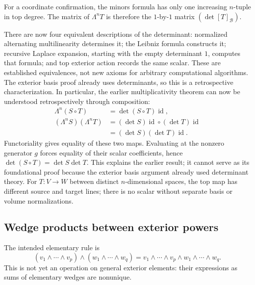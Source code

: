 For a coordinate confirmation, the minors formula has only one increasing
$n$-tuple in top degree. The matrix of $\Lambda^nT$ is therefore the
$1$-by-$1$ matrix $(\det[T]_{\mathcal B})$.

There are now four equivalent descriptions of the determinant:
normalized alternating multilinearity determines it; the Leibniz formula
constructs it; recursive Laplace expansion, starting with the empty
determinant $1$, computes that formula; and top exterior action records
the same scalar. These are established equivalences, not new axioms for
arbitrary computational algorithms. The exterior basis proof already uses
determinants, so this is a retrospective characterization.
In particular, the earlier multiplicativity theorem can now be understood
retrospectively through composition:
\[
\begin{aligned}
\Lambda^n(S\circ T)&=\det(S\circ T)\operatorname{id},\\
(\Lambda^nS)(\Lambda^nT)
&=(\det S)\operatorname{id}\circ(\det T)\operatorname{id}\\
&=(\det S)(\det T)\operatorname{id}.
\end{aligned}
\]
Functoriality gives equality of these two maps. Evaluating at the nonzero
generator $g$ forces equality of their scalar coefficients, hence
$\det(S\circ T)=\det S\det T$. This explains the earlier result; it
cannot serve as its foundational proof because the exterior basis argument
already used determinant theory.
For $T:V\to W$ between distinct $n$-dimensional spaces, the top map has
different source and target lines; there is no scalar without separate
basis or volume normalizations.

\subsection{Wedge products between exterior powers}
\label{sec:exterior-multiplication}
The intended elementary rule is
\[
(v_1\wedge\cdots\wedge v_p)\wedge(w_1\wedge\cdots\wedge w_q)
=v_1\wedge\cdots\wedge v_p\wedge w_1\wedge\cdots\wedge w_q.
\]
This is not yet an operation on general exterior elements: their expressions
as sums of elementary wedges are nonunique.

